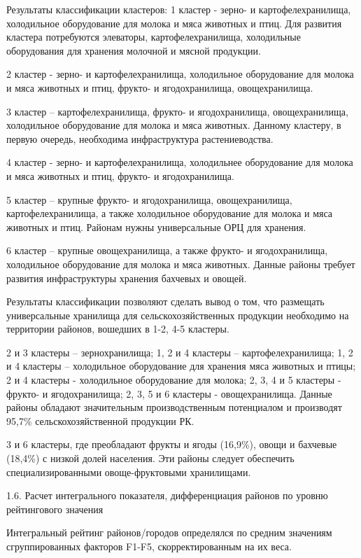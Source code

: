 \begin{multicols}{2}
Результаты классификации кластеров: 1 кластер - зерно- и
картофелехранилища, холодильное оборудование для молока и мяса животных
и птиц. Для развития кластера потребуются элеваторы, картофелехранилища,
холодильные оборудования для хранения молочной и мясной продукции.

2 кластер - зерно- и картофелехранилища, холодильное оборудование для
молока и мяса животных и птиц, фрукто- и ягодохранилища, овощехранилища.

3 кластер -- картофелехранилища, фрукто- и ягодохранилища,
овощехранилища, холодильное оборудование для молока и мяса животных.
Данному кластеру, в первую очередь, необходима инфраструктура
растениеводства.

4 кластер - зерно- и картофелехранилища, холодильнее оборудование для
молока и мяса животных и птиц, фрукто- и ягодохранилища.

5 кластер -- крупные фрукто- и ягодохранилища, овощехранилища,
картофелехранилища, а также холодильное оборудование для молока и мяса
животных и птиц. Районам нужны универсальные ОРЦ для хранения.

6 кластер -- крупные овощехранилища, а также фрукто- и ягодохранилища,
холодильное оборудование для молока и мяса животных. Данные районы
требует развития инфраструктуры хранения бахчевых и овощей.

Результаты классификации позволяют сделать вывод о том, что размещать
универсальные хранилища для сельскохозяйственных продукции необходимо на
территории районов, вошедших в 1-2, 4-5 кластеры.

2 и 3 кластеры -- зернохранилища; 1, 2 и 4 кластеры --
картофелехранилища; 1, 2 и 4 кластеры -- холодильное оборудование для
хранения мяса животных и птицы; 2 и 4 кластеры - холодильное
оборудование для молока; 2, 3, 4 и 5 кластеры - фрукто- и
ягодохранилища; 2, 3, 5 и 6 кластеры - овощехранилища. Данные районы
обладают значительным производственным потенциалом и производят 95,7\%
сельскохозяйственной продукции РК.

3 и 6 кластеры, где преобладают фрукты и ягоды (16,9\%), овощи и
бахчевые (18,4\%) с низкой долей населения. Эти районы следует
обеспечить специализированными овоще-фруктовыми хранилищами.

1.6. Расчет интегрального показателя, дифференциация районов по уровню
рейтингового значения

Интегральный рейтинг районов/городов определялся по средним значениям
сгруппированных факторов F1-F5, скорректированным на их веса.


\end{multicols}

